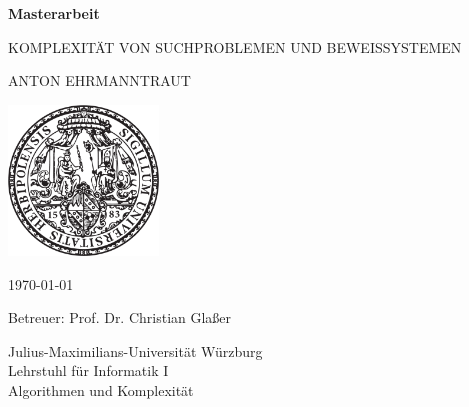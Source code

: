 \pagestyle{empty}

\begin{center}{

\vfill\sffamily

{\Large\textbf{Masterarbeit}}\par
    \vspace*{1cm}
{\huge{KOMPLEXITÄT VON SUCHPROBLEMEN UND BEWEISSYSTEMEN}}\par
    \vspace*{.3cm}
{\Large{ANTON EHRMANNTRAUT}}\par}
\vspace*{5cm}

\includegraphics[width=4cm]{siegel.pdf}

\vspace*{2cm}


{\large\sffamily\today}\vspace*{.7cm}

{\large\sffamily Betreuer: Prof. Dr. Christian Glaßer}\vspace*{.5cm}


{\large\sffamily
Julius-Maximilians-Universität Würzburg\\
Lehrstuhl für Informatik I\\
Algorithmen und Komplexität
}


\end{center}

\cleardoublepage
\restoregeometry

\tableofcontents
\thispagestyle{empty}
\cleardoublepage
{}
\pagestyle{main}

